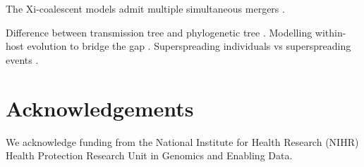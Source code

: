 \documentclass{article}
\begin{document}
The Xi-coalescent models admit multiple 
simultaneous mergers \citep{schweinsbergCoalescentsSimultaneousMultiple2000}.

Difference between transmission tree and phylogenetic tree \citep{Jombart2011}. 
Modelling within-host evolution to bridge the gap \citep{Didelot2014,Hall2015,Didelot2017}.
Superspreading individuals vs superspreading events \citep{Riley2003,Wallinga2004,hoAccountingPotentialOverdispersion2023}.

\section*{Acknowledgements}

We acknowledge funding from the National Institute for Health Research (NIHR) Health Protection Research Unit in Genomics and Enabling Data.

\clearpage

%

\end{document}
